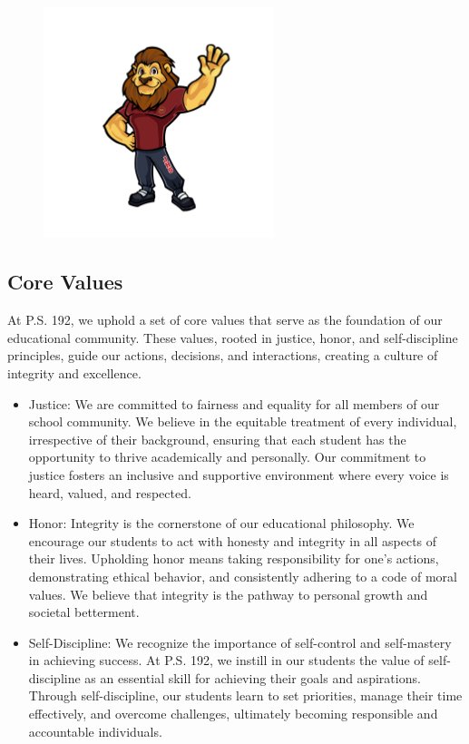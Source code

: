 \documentclass[letterpaper, 11pt]{article}
\begin{document}
\begin{figure}
\centering
\includegraphics[width=0.6\textwidth]{logohim.jpg}
\end{figure}

\subsection{Core Values}
\label{sec:orgf44348c}
At P.S. 192, we uphold a set of core values that serve as the foundation of our educational community. These values, rooted in justice, honor, and self-discipline principles, guide our actions, decisions, and interactions, creating a culture of integrity and excellence.

\begin{itemize}
\item Justice: We are committed to fairness and equality for all members of our school community. We believe in the equitable treatment of every individual, irrespective of their background, ensuring that each student has the opportunity to thrive academically and personally. Our commitment to justice fosters an inclusive and supportive environment where every voice is heard, valued, and respected.
\item Honor: Integrity is the cornerstone of our educational philosophy. We encourage our students to act with honesty and integrity in all aspects of their lives. Upholding honor means taking responsibility for one's actions, demonstrating ethical behavior, and consistently adhering to a code of moral values. We believe that integrity is the pathway to personal growth and societal betterment.
\item Self-Discipline: We recognize the importance of self-control and self-mastery in achieving success. At P.S. 192, we instill in our students the value of self-discipline as an essential skill for achieving their goals and aspirations. Through self-discipline, our students learn to set priorities, manage their time effectively, and overcome challenges, ultimately becoming responsible and accountable individuals.
\end{itemize}
\end{document}
